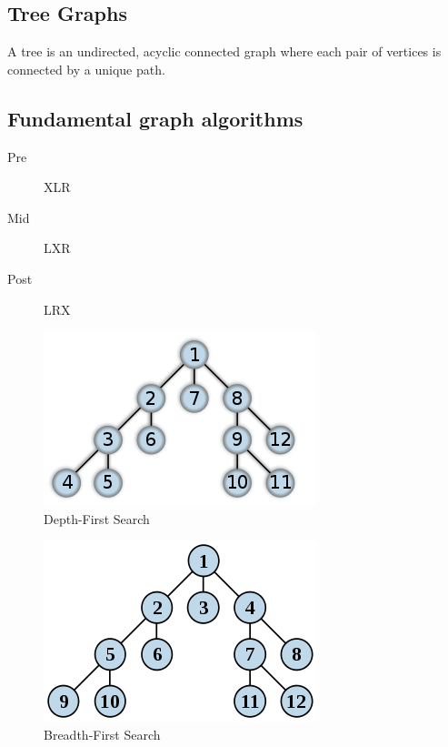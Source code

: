 \documentclass[11pt,journal,compsoc]{IEEEtran}
\begin{document}
\subsection{Tree Graphs}

A tree is an undirected, acyclic connected graph where each pair of vertices is connected by a unique path.

\subsection{Fundamental graph algorithms}

\begin{description}
    \item[Pre] XLR
    \item[Mid] LXR
    \item[Post] LRX
\end{description}

\begin{figure}
    \centering
    \includegraphics[width=\linewidth]{DFS.png}
    \caption{Depth-First Search}
\end{figure}

\begin{figure}
    \centering
    \includegraphics[width=\linewidth]{BFS.png}
    \caption{Breadth-First Search}
\end{figure}
\end{document}
